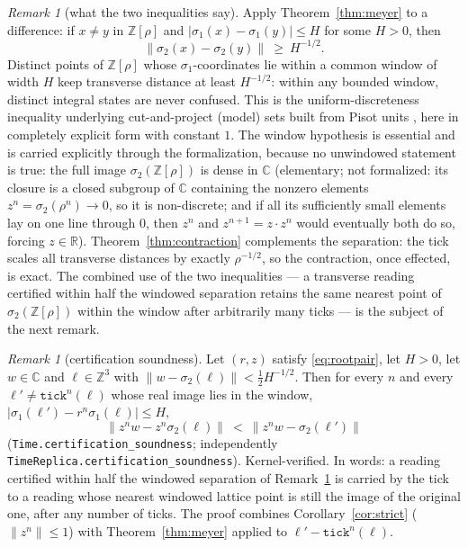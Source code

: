 \documentclass[11pt]{amsart}
\theoremstyle{plain}
\theoremstyle{definition}
\theoremstyle{remark}
\newtheorem{remark}[theorem]{Remark}
\begin{document}
\begin{remark}[what the two inequalities say]\label{rem:sober}
Apply Theorem~\ref{thm:meyer} to a difference: if $x \ne y$ in $\mathbb{Z}[\rho]$ and $|\sigma_1(x) - \sigma_1(y)| \le H$ for some $H > 0$, then
\[
  \lVert \sigma_2(x) - \sigma_2(y) \rVert \ \ge\ H^{-1/2} .
\]
Distinct points of $\mathbb{Z}[\rho]$ whose $\sigma_1$-coordinates lie within a common window of width $H$ keep transverse distance at least $H^{-1/2}$: within any bounded window, distinct integral states are never confused. This is the uniform-discreteness inequality underlying cut-and-project (model) sets built from Pisot units \cite{hof1995,schlottmann2000,baakegrimm2013}, here in completely explicit form with constant $1$. The window hypothesis is essential and is carried explicitly through the formalization, because no unwindowed statement is true: the full image $\sigma_2(\mathbb{Z}[\rho])$ is dense in $\mathbb{C}$ (elementary; not formalized: its closure is a closed subgroup of $\mathbb{C}$ containing the nonzero elements $z^n = \sigma_2(\rho^n) \to 0$, so it is non-discrete; and if all its sufficiently small elements lay on one line through $0$, then $z^n$ and $z^{n+1} = z \cdot z^n$ would eventually both do so, forcing $z \in \mathbb{R}$). Theorem~\ref{thm:contraction} complements the separation: the tick scales all transverse distances by exactly $\rho^{-1/2}$, so the contraction, once effected, is exact. The combined use of the two inequalities --- a transverse reading certified within half the windowed separation retains the same nearest point of $\sigma_2(\mathbb{Z}[\rho])$ within the window after arbitrarily many ticks --- is the subject of the next remark.
\end{remark}

\begin{remark}[certification soundness]\label{rem:certification}
Let $(r, z)$ satisfy \eqref{eq:rootpair}, let $H > 0$, let $w \in \mathbb{C}$ and $\ell \in \mathbb{Z}^3$ with $\lVert w - \sigma_2(\ell) \rVert < \tfrac12 H^{-1/2}$. Then for every $n$ and every $\ell' \ne \mathtt{tick}^n(\ell)$ whose real image lies in the window, $\lvert \sigma_1(\ell') - r^n \sigma_1(\ell) \rvert \le H$,
\[
  \lVert z^n w - z^n \sigma_2(\ell) \rVert \ <\ \lVert z^n w - \sigma_2(\ell') \rVert
\]
\textup{(\texttt{Time.certification\_soundness}; independently \texttt{TimeReplica.certification\_soundness})}. Kernel-verified. In words: a reading certified within half the windowed separation of Remark~\ref{rem:sober} is carried by the tick to a reading whose nearest windowed lattice point is still the image of the original one, after any number of ticks. The proof combines Corollary~\ref{cor:strict} ($\lVert z^n \rVert \le 1$) with Theorem~\ref{thm:meyer} applied to $\ell' - \mathtt{tick}^n(\ell)$.
\end{remark}
\end{document}
